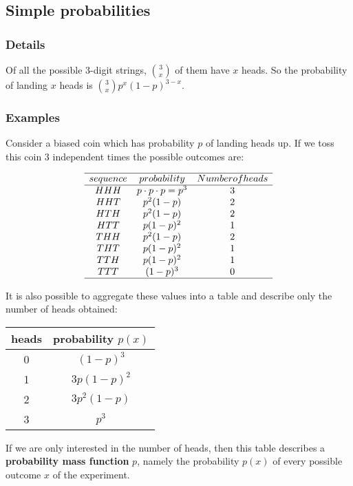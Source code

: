 \documentclass[12pt,a4paper]{article}
\theoremstyle{regla}
\theoremstyle{remark}
\theoremstyle{definition}
\theoremstyle{nonumberbreak}
\begin{document}
\subsection{Simple probabilities}
\subsubsection{Details}
Of all the possible 3-digit strings, $\binom{3}{x}$ of them have $x$ heads. So the probability of landing $x$ heads is $\binom{3}{x}p^x(1-p)^{3-x}$.
\subsubsection{Examples}
\begin{xmpl}
Consider a biased coin which has probability $p$ of landing heads up. If we toss this coin 3 independent times the possible outcomes are:

$$
\begin{array}{c c c}
\hline
sequence & probability	& Number of heads\\
\hline				
HHH & p \cdot p \cdot p=p^3 & 3\\
HHT & p^2(1-p) & 2\\
HTH & p^2(1-p) & 2 \\
HTT & p(1-p)^2 & 1\\
THH & p^2(1-p) & 2\\
THT & p(1-p)^2 & 1\\	
TTH & p(1-p)^2 & 1\\
TTT & (1-p)^3 & 0\\
\hline
\end{array}
$$
\end{xmpl}
\begin{xmpl}


It is also possible to aggregate these values into a table and describe only the number of heads obtained:\\

\begin{tabular}{c c}
\hline
heads & probability $p(x)$\\
\hline				
0 & $(1-p)^3$\\
1 & $3p(1-p)^2$\\
2 & $3p^2(1-p)$\\
3 & $p^3$ \\
\hline
\end{tabular}

If we are only interested in the number of heads, then
this table describes a \textbf{probability mass function} $p$, namely the probability $p(x)$ of every possible outcome $x$
of the experiment.
\end{xmpl}
\end{document}
